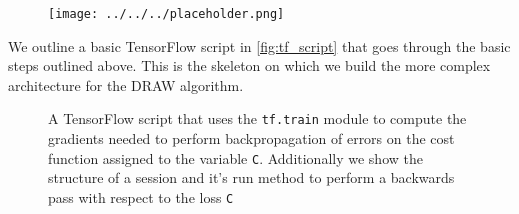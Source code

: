 \begin{figure}[H]
\centering
\texttt{[image: ../../../placeholder.png]}
\caption{}\label{fig:grad_graph}
\end{figure}

We outline a basic TensorFlow script in \ref{fig:tf_script} that goes through the basic steps outlined above. This is the skeleton on which we build the more complex architecture for the DRAW algorithm.

\begin{figure}[H] 
\centering

\caption[Computing gradients and performing back-propagation in TensorFlow]{A TensorFlow script that uses the \lstinline{tf.train} module to compute the gradients needed to perform backpropagation of errors on the cost function assigned to the variable \lstinline{C}. Additionally we show the structure of a session and it's run method to perform a backwards pass with respect to the loss \lstinline{C}}\label{code:tf_script}
\end{figure}
